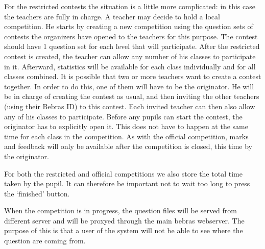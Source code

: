 For the restricted contests the situation is a little more complicated: in this case the teachers are fully 
in charge. A teacher may decide to hold a local competition. He starts by creating a new competition using 
the question sets of contests the organizers have opened to the teachers for this purpose. The contest 
should have 1 question set for each level that will participate. After the restricted contest is created, 
the teacher can allow any number of his classes to participate in it. Afterward, statistics will be 
available for each class individually and for all classes combined. It is possible that two or more teachers 
want to create a contest together. In order to do this, one of them will have to be the originator. He will 
be in charge of creating the contest as usual, and then inviting the other teachers (using their Bebras ID) 
to this contest. Each invited teacher can then also allow any of his classes to participate. Before any 
pupils can start the contest, the originator has to explicitly open it. This does not have to happen at the 
same time for each class in the competition. As with the official competition, marks and feedback will only 
be available after the competition is closed, this time by the originator.

For both the restricted and official competitions we also store the total time taken by the pupil. It can 
therefore be important not to wait too long to press the `finished' button.     

When the competition is in progress, the question files will be served from different server and will be proxyed through the main bebras webserver. The purpose of this is that a user of the system will not be able to see where the question are coming from. 